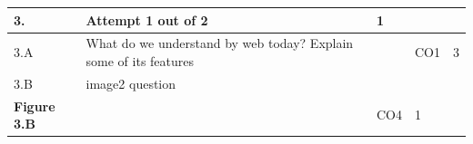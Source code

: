 \documentclass[12pt]{article}
\begin{document}
\begin{tabular}{|L{1cm}|L{8cm}|C{1cm}|C{1cm}|C{1cm}|}
	\bf3. & \bf{Attempt} \bf{1} \bf{out of} \bf{2} & \bf{1}  & & \\ \hline





		3.A &
	What do we understand by web today? Explain some of its features \newline
			
	 &   & CO1 & 3\\ \hline
		3.B &
	image2 question \newline
			\begin{center}
		\includegraphics[width=4cm,height=3cm]{media/diagrams/image2.jpg}\\\bf{Figure }\bf3.B		
	\end{center}
		
	 &   & CO4 & 1\\ \hline
	\end{tabular}
\end{document}
